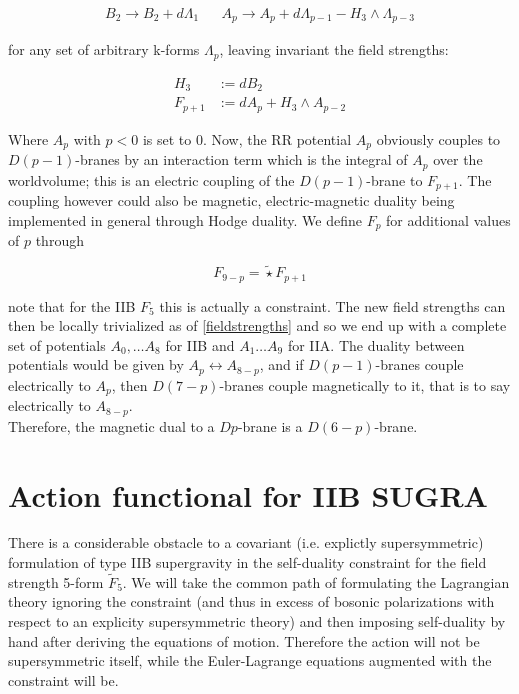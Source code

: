 \begin{align}
B_2 \rightarrow B_2 + d\Lambda_1 && A_p \rightarrow A_p + d\Lambda_{p-1} - H_3 \wedge \Lambda_{p-3}
\end{align}

for any set of arbitrary k-forms $\Lambda_p$, leaving invariant the field strengths:

\begin{equation}
\begin{aligned}
H_3 &:= dB_2 \\
F_{p+1} &:= dA_p + H_3 \wedge A_{p-2} \label{fieldstrengths}
\end{aligned}
\end{equation}

Where $A_{p}$ with $p<0$ is set to $0$. Now, the RR potential $A_{p}$ obviously couples to $D(p-1)$-branes by an interaction term which is the integral of $A_{p}$ over the worldvolume; this is an electric coupling of the $D(p-1)$-brane to $F_{p+1}$. The coupling however could also be magnetic, electric-magnetic duality being implemented in general through Hodge duality. We define $F_p$ for additional values of $p$ through

\begin{equation}
F_{9-p} = \widetilde\star F_{p+1}
\end{equation}

note that for the IIB $F_5$ this is actually a constraint. The new field strengths can then be locally trivialized as of \ref{fieldstrengths} and so we end up with a complete set of potentials $A_0, \ldots A_8$ for IIB and $A_1 \ldots A_9$ for IIA. The duality between potentials would be given by $A_p \leftrightarrow A_{8-p}$, and if $D(p-1)$-branes couple electrically to $A_p$, then $D(7-p)$-branes couple magnetically to it, that is to say electrically to $A_{8-p}$.\\

Therefore, the magnetic dual to a $Dp$-brane is a $D(6-p)$-brane.

\section{Action functional for IIB SUGRA}

There is a considerable obstacle to a covariant (i.e. explictly supersymmetric) formulation of type IIB supergravity in the self-duality constraint for the field strength 5-form $\tilde{F}_5$. We will take the common path of formulating the Lagrangian theory ignoring the constraint (and thus in excess of bosonic polarizations with respect to an explicity supersymmetric theory) and then imposing self-duality by hand after deriving the equations of motion. Therefore the action will not be supersymmetric itself, while the Euler-Lagrange equations augmented with the constraint will be.\\

